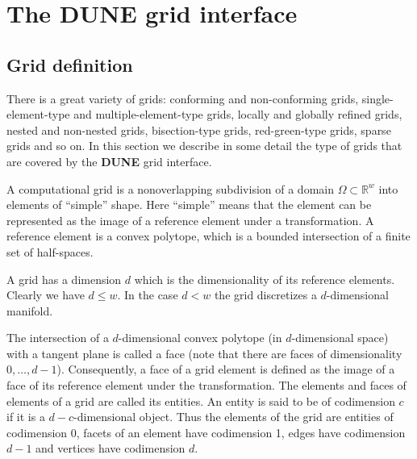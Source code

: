 \documentclass[11pt,a4paper,headinclude,footinclude,DIV16,normalheadings]{scrreprt}
\newcommand{\R}{\mathbb{R}}
\newcommand{\Dune}{{\sf\bfseries DUNE}}
\begin{document}
\chapter{The \texorpdfstring{\Dune{}}{DUNE} grid interface}


\section{Grid definition}

There is a great variety of grids: conforming and non-conforming
grids, single-element-type and multiple-element-type grids, locally
and globally refined grids, nested and non-nested grids,
bisection-type grids, red-green-type grids, sparse grids and so on. In
this section we describe in some detail the type of grids that are
covered by the \Dune{} grid interface.


A computational grid is a nonoverlapping subdivision of a domain
$\Omega\subset\R^w$ into elements of ``simple'' shape. Here ``simple''
means that the element can be represented as the image of a reference
element under a transformation. A reference element is a convex
polytope, which is a bounded intersection of a finite set of
half-spaces. 


A grid has a dimension $d$ which is the dimensionality of
its reference elements. Clearly we have $d\leq w$. In the case $d<w$ the grid
discretizes a $d$-dimensional manifold. 


The intersection of a $d$-dimensional convex polytope (in
$d$-dimensional space) with a
tangent plane is called a face (note that there are faces of
dimensionality $0,\ldots,d-1$). Consequently, a face of a grid element
is defined as the image of a face of its reference element under the
transformation. The elements and faces of elements of a grid are
called its entities. An entity is said to be of codimension $c$ if it
is a $d-c$-dimensional object. Thus the elements of the grid are
entities of codimension 0, facets of an element have codimension 1,
edges have codimension $d-1$ and vertices have codimension $d$.
\end{document}
